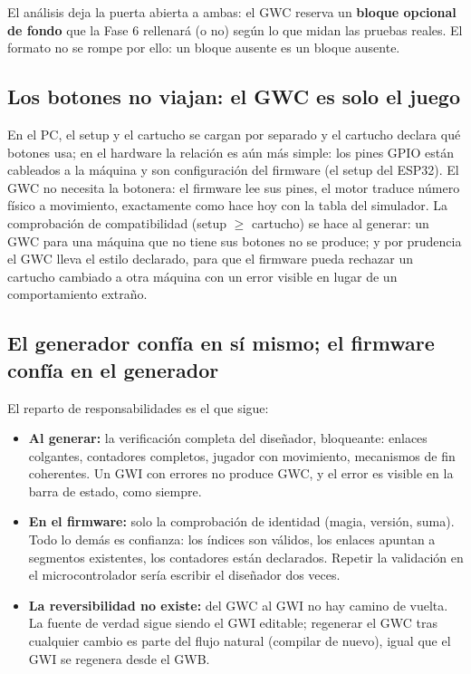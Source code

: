 El análisis deja la puerta abierta a ambas: el GWC reserva un
\textbf{bloque opcional de fondo} que la Fase 6 rellenará (o no)
según lo que midan las pruebas reales. El formato no se rompe por
ello: un bloque ausente es un bloque ausente.

\subsection{Los botones no viajan: el GWC es solo el juego}
\label{sec:F5Botones}

En el PC, el setup y el cartucho se cargan por separado y el
cartucho declara qué botones usa; en el hardware la relación es aún
más simple: los pines GPIO están cableados a la máquina y son
configuración del firmware (el setup del ESP32). El GWC no necesita
la botonera: el firmware lee sus pines, el motor traduce número
físico a movimiento, exactamente como hace hoy con la tabla del
simulador. La comprobación de compatibilidad (setup $\geq$
cartucho) se hace al generar: un GWC para una máquina que no tiene
sus botones no se produce; y por prudencia el GWC lleva el estilo
declarado, para que el firmware pueda rechazar un cartucho cambiado
a otra máquina con un error visible en lugar de un comportamiento
extraño.

\subsection{El generador confía en sí mismo; el firmware confía en el generador}
\label{sec:F5Confianza}

El reparto de responsabilidades es el que sigue:

\begin{itemize}
	\item \textbf{Al generar:} la verificación completa del diseñador,
	bloqueante: enlaces colgantes, contadores completos, jugador con
	movimiento, mecanismos de fin coherentes. Un GWI con errores no
	produce GWC, y el error es visible en la barra de estado, como
	siempre.
	
	\item \textbf{En el firmware:} solo la comprobación de identidad
	(magia, versión, suma). Todo lo demás es confianza: los índices son
	válidos, los enlaces apuntan a segmentos existentes, los contadores
	están declarados. Repetir la validación en el microcontrolador
	sería escribir el diseñador dos veces.
	
	\item \textbf{La reversibilidad no existe:} del GWC al GWI no hay
	camino de vuelta. La fuente de verdad sigue siendo el GWI editable;
	regenerar el GWC tras cualquier cambio es parte del flujo natural
	(compilar de nuevo), igual que el GWI se regenera desde el GWB.
	
\end{itemize}

